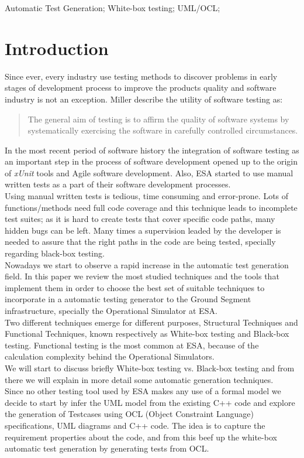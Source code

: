 \documentclass[10pt, conference, compsocconf]{IEEEtran}
\newcommand{\xunit}{\textit{xUnit}}
\begin{document}
\begin{IEEEkeywords}
Automatic Test Generation; White-box testing; UML/OCL;
\end{IEEEkeywords}

\IEEEpeerreviewmaketitle

\section{Introduction}\label{introd}
Since ever, every industry use testing methods to discover problems in early stages of development process to improve
the products quality and software industry is not an exception. Miller\cite{miller} describe the utility
of software testing as:

\begin{quotation}
The general aim of testing is to affirm the quality of software systems by systematically
exercising the software in carefully controlled circumstances.
\end{quotation}

In the most recent period of software history the integration of
software testing as an important step in the process of
software development opened up to the origin of \xunit\cite{xunit}
tools and Agile software development.
Also, ESA started to use manual written tests as a part of their
software development processes.\\
Using  manual written tests is tedious, time consuming and error-prone.
Lots of functions/methods need full code coverage and this technique
leads to incomplete test suites;
as it is hard to create tests that cover specific code paths, many
hidden bugs can be left.
Many times a supervision leaded by the developer
is needed to assure that the right paths in the code are being tested,
specially regarding black-box testing.\\
Nowadays we start to observe a rapid increase in the automatic test
generation field.
In this paper we review the most studied techniques
and the tools that implement them in order to choose the best set of
suitable techniques to incorporate in a automatic
testing generator to the Ground Segment infrastructure, specially the
Operational Simulator at ESA.\\
Two different techniques emerge for different purposes, Structural
Techniques and Functional Techniques,
known respectively as White-box testing and Black-box\cite{black} testing.
Functional testing is the most common at ESA, because of the
calculation complexity behind the Operational Simulators.\\
We will start to discuss briefly White-box testing vs. Black-box
testing and from there we will explain in more detail some automatic
generation techniques.\\
\indent Since no other testing tool used by ESA makes any use of a
formal model we decide to start by infer the UML model
from the existing C++
code and explore the generation of Testcases using OCL (Object
Constraint Language) specifications, UML diagrams and C++ code.
The idea is to capture the requirement properties about the code, and
from this beef up the white-box automatic test generation by
generating tests from OCL.
\end{document}
